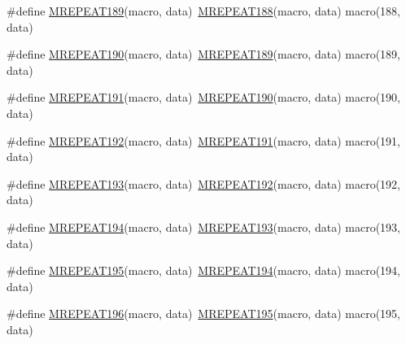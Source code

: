 \begin{DoxyCompactItemize}
\item 
\#define \mbox{\hyperlink{group__group__sam0__utils__mrepeat_ga691dc645795e6f5cb2083e198a7af972}{M\+R\+E\+P\+E\+A\+T189}}(macro,  data)~\mbox{\hyperlink{group__group__sam0__utils__mrepeat_ga58e111ce05110cc0fe761789c2ec761a}{M\+R\+E\+P\+E\+A\+T188}}(macro, data)   macro(188, data)
\item 
\#define \mbox{\hyperlink{group__group__sam0__utils__mrepeat_ga90b2ca3e144e35ea7d3f1f757868cbab}{M\+R\+E\+P\+E\+A\+T190}}(macro,  data)~\mbox{\hyperlink{group__group__sam0__utils__mrepeat_ga691dc645795e6f5cb2083e198a7af972}{M\+R\+E\+P\+E\+A\+T189}}(macro, data)   macro(189, data)
\item 
\#define \mbox{\hyperlink{group__group__sam0__utils__mrepeat_ga8914eac2b15fba3933b8bd800427a153}{M\+R\+E\+P\+E\+A\+T191}}(macro,  data)~\mbox{\hyperlink{group__group__sam0__utils__mrepeat_ga90b2ca3e144e35ea7d3f1f757868cbab}{M\+R\+E\+P\+E\+A\+T190}}(macro, data)   macro(190, data)
\item 
\#define \mbox{\hyperlink{group__group__sam0__utils__mrepeat_ga409d357004e39610efaaad55f3325484}{M\+R\+E\+P\+E\+A\+T192}}(macro,  data)~\mbox{\hyperlink{group__group__sam0__utils__mrepeat_ga8914eac2b15fba3933b8bd800427a153}{M\+R\+E\+P\+E\+A\+T191}}(macro, data)   macro(191, data)
\item 
\#define \mbox{\hyperlink{group__group__sam0__utils__mrepeat_ga44cace8e364132f4472cb81dabb2e525}{M\+R\+E\+P\+E\+A\+T193}}(macro,  data)~\mbox{\hyperlink{group__group__sam0__utils__mrepeat_ga409d357004e39610efaaad55f3325484}{M\+R\+E\+P\+E\+A\+T192}}(macro, data)   macro(192, data)
\item 
\#define \mbox{\hyperlink{group__group__sam0__utils__mrepeat_gad99185ad8f1a4a6a5597cf80d2ef1453}{M\+R\+E\+P\+E\+A\+T194}}(macro,  data)~\mbox{\hyperlink{group__group__sam0__utils__mrepeat_ga44cace8e364132f4472cb81dabb2e525}{M\+R\+E\+P\+E\+A\+T193}}(macro, data)   macro(193, data)
\item 
\#define \mbox{\hyperlink{group__group__sam0__utils__mrepeat_ga9b1f8ebc91ab6f86e156010f11811cfa}{M\+R\+E\+P\+E\+A\+T195}}(macro,  data)~\mbox{\hyperlink{group__group__sam0__utils__mrepeat_gad99185ad8f1a4a6a5597cf80d2ef1453}{M\+R\+E\+P\+E\+A\+T194}}(macro, data)   macro(194, data)
\item 
\#define \mbox{\hyperlink{group__group__sam0__utils__mrepeat_ga960fa8ced64817d70ae389a75693f351}{M\+R\+E\+P\+E\+A\+T196}}(macro,  data)~\mbox{\hyperlink{group__group__sam0__utils__mrepeat_ga9b1f8ebc91ab6f86e156010f11811cfa}{M\+R\+E\+P\+E\+A\+T195}}(macro, data)   macro(195, data)

\end{DoxyCompactItemize}
